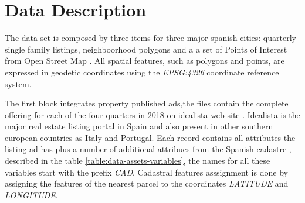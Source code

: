 \documentclass[times,final]{elsarticle}
\begin{document}
\section*{Data Description}

\noindent

The data set is composed by three items for three major spanish cities: quarterly single family listings, neighboorhood polygons and a a set of Points of Interest from Open Street Map \cite{OpenStreetMap}. All spatial features, such as polygons and points, are expressed in geodetic coordinates using the \emph{EPSG:4326} coordinate reference system.

The first block integrates property published ads,the files contain the complete offering for each of the four quarters in 2018 on idealista web site \cite{idealista}. Idealista is the major real estate listing portal in Spain and also present in other southern european countries as Italy and Portugal. Each record contains all attributes the listing ad has plus a number of additional attribues from the Spanish cadastre \cite{Catastro}, described in the table \ref{table:data-assets-variables}, the names for all these variables start with the prefix \emph{CAD}. Cadastral features asssignment is done by assigning the features of the nearest parcel to the coordinates \emph{LATITUDE} and \emph{LONGITUDE}.
\end{document}
